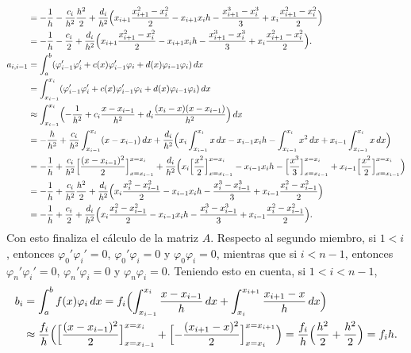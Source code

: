 \documentclass[a4paper, 10pt, oneside]{report}
\begin{document}
\begin{align*}
    &= -\frac{1}{h}-\frac{c_i}{h^2}\frac{h^2}{2}+\frac{d_i}{h^2}\Bigl(x_{i+1}\frac{x_{i+1}^2-x_i^2}{2}-x_{i+1}x_ih -\frac{x_{i+1}^3-x_i^3}{3}+x_i\frac{x_{i+1}^2-x_i^2}{2}\Bigr) \\
    &= -\frac{1}{h}-\frac{c_i}{2}+\frac{d_i}{h^2}\Bigl(x_{i+1}\frac{x_{i+1}^2-x_i^2}{2}-x_{i+1}x_ih -\frac{x_{i+1}^3-x_i^3}{3}+x_i\frac{x_{i+1}^2-x_i^2}{2}\Bigr). \\
    a_{i,i-1} &= \int_a^b (\varphi_{i-1}'\varphi_i'+c(x)\varphi_{i-1}'\varphi_i+d(x)\varphi_{i-1}\varphi_i) \, dx \\
    &= \int_{x_{i-1}}^{x_{i}} (\varphi_{i-1}'\varphi_i'+c(x)\varphi_{i-1}'\varphi_i+d(x)\varphi_{i-1}\varphi_i) \, dx \\
    &\approx \int_{x_{i-1}}^{x_{i}} \Bigl(-\frac{1}{h^2}+c_i\frac{x-x_{i-1}}{h^2}+d_i\frac{(x_i-x)(x-x_{i-1})}{h^2}\Bigr) \, dx \\
    &= -\frac{h}{h^2}+\frac{c_i}{h^2}\int_{x_{i-1}}^{x_i}(x-x_{i-1})\, dx+\frac{d_i}{h^2}\Bigl(x_{i}\int_{x_{i-1}}^{x_i}x\, dx -x_{i-1}x_ih -\int_{x_{i-1}}^{x_i}x^2\, dx+x_{i-1}\int_{x_{i-1}}^{x_i}x\, dx\Bigr) \\
    &= -\frac{1}{h}+\frac{c_i}{h^2}\Bigl[\frac{(x-x_{i-1})^2}{2}\Bigr]_{x=x_{i-1}}^{x=x_i}+\frac{d_i}{h^2}\Bigl(x_{i}\Bigl[\frac{x^2}{2}\Bigr]_{x=x_{i-1}}^{x=x_i} -x_{i-1}x_ih -\Bigl[\frac{x^3}{3}\Bigr]_{x=x_{i-1}}^{x=x_i}+x_{i-1}\Bigl[\frac{x^2}{2}\Bigr]_{x=x_{i-1}}^{x=x_i}\Bigr) \\
    &= -\frac{1}{h}+\frac{c_i}{h^2}\frac{h^2}{2}+\frac{d_i}{h^2}\Bigl(x_{i}\frac{x_{i}^2-x_{i-1}^2}{2}-x_{i-1}x_ih -\frac{x_{i}^3-x_{i-1}^3}{3}+x_{i-1}\frac{x_{i}^2-x_{i-1}^2}{2}\Bigr) \\
    &= -\frac{1}{h}+\frac{c_i}{2}+\frac{d_i}{h^2}\Bigl(x_{i}\frac{x_{i}^2-x_{i-1}^2}{2}-x_{i-1}x_ih -\frac{x_{i}^3-x_{i-1}^3}{3}+x_{i-1}\frac{x_{i}^2-x_{i-1}^2}{2}\Bigr).
\end{align*}
Con esto finaliza el cálculo de la matriz $A$. Respecto al segundo miembro, si $1 < i$, entonces $\varphi_0'\varphi_i' = 0$, $\varphi_0'\varphi_i = 0$ y $\varphi_0\varphi_i = 0$, mientras que si $i < n-1$, entonces $\varphi_n'\varphi_i' = 0$, $\varphi_n'\varphi_i = 0$ y $\varphi_n\varphi_i = 0$. Teniendo esto en cuenta, si $1<i<n-1$,
\begin{align*}
    b_i &= \int_a^bf(x)\varphi_i\, dx = f_i\Bigl(\int_{x_{i-1}}^{x_{i}} \frac{x-x_{i-1}}{h}\, dx+\int_{x_i}^{x_{i+1}}\frac{x_{i+1}-x}{h}\, dx\Bigr) \\
    &\approx \frac{f_i}{h}\Bigl(\Bigl[\frac{(x-x_{i-1})^2}{2}\Bigr]_{x=x_{i-1}}^{x=x_i}+\Bigl[-\frac{(x_{i+1}-x)^2}{2}\Bigr]_{x=x_{i}}^{x=x_{i+1}}\Bigr) =\frac{f_i}{h}\Bigl(\frac{h^2}{2}+\frac{h^2}{2}\Bigr) =f_ih.
\end{align*}
\end{document}
